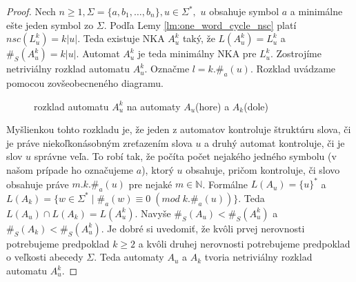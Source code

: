 \begin{proof}
Nech $ n \geq 1, \Sigma = \lbrace a, b_1, \ldots , b_n \rbrace, u \in \Sigma^*,$ $ u $ obsahuje symbol $ a $ a minimálne ešte jeden symbol zo $ \Sigma $. Podľa Lemy \ref{lm:one_word_cycle_nsc} platí $ nsc(L_u^k) = k|u| $. Teda existuje NKA $ A_u^k $ taký, že $ L(A_u^k) = L_u^k $ a $ \#_S(A_u^k) = k|u| $. Automat $ A_u^k $ je teda minimálny NKA pre $ L_u^k $. Zostrojíme netriviálny rozklad automatu $ A_u^k $. Označme $ l = k.\#_a(u) $. Rozklad uvádzame pomocou zovšeobecneného diagramu.

\begin{figure}[H]
\centering
{}


\caption{rozklad automatu $ A_u^k $ na automaty $ A_u $(hore) a $ A_k $(dole)}
\end{figure}

Myšlienkou tohto rozkladu je, že jeden z automatov kontroluje štruktúru slova, či je práve niekoľkonásobným zreťazením slova $ u $ a druhý automat kontroluje, či je slov $ u $ správne veľa. To robí tak, že počíta počet nejakého jedného symbolu (v našom prípade ho označujeme $ a $), ktorý $ u $ obsahuje, pričom kontroluje, či slovo obsahuje práve $ m.k.\#_a(u) $ pre nejaké $ m \in \mathbb{N} $. Formálne $ L(A_u) = \lbrace u \rbrace^* $ a $ L(A_k) = \lbrace w \in \Sigma^* \; | \; \#_a(w) \equiv 0 \; (mod \; k.\#_a(u)) \rbrace $. Teda $ L(A_u) \cap L(A_k) = L(A_u^k) $. Navyše $ \#_S(A_u) < \#_S(A_u^k) $ a $ \#_S(A_k) < \#_S(A_u^k) $. Je dobré si uvedomiť, že kvôli prvej nerovnosti potrebujeme predpoklad $ k \geq 2 $ a kvôli druhej nerovnosti potrebujeme predpoklad o veľkosti abecedy $ \Sigma $. Teda automaty $ A_u $ a $ A_k $ tvoria netriviálny rozklad automatu $ A_u^k $.


\end{proof}
